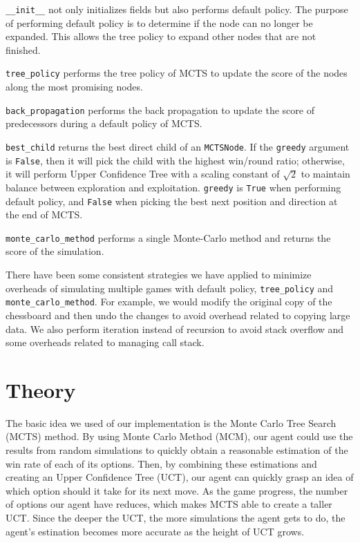 \documentclass[twoside,11pt]{article}
\begin{document}
\texttt{\_\_init\_\_} not only initializes fields but also performs default policy.
The purpose of performing default policy is to determine if the node can no longer be expanded.
This allows the tree policy to expand other nodes that are not finished.

\texttt{tree\_policy} performs the tree policy of MCTS to update the score of the nodes along the most promising nodes.

\texttt{back\_propagation} performs the back propagation to update the score of predecessors during a default policy of MCTS.

\texttt{best\_child} returns the best direct child of an \texttt{MCTSNode}.
If the \texttt{greedy} argument is \texttt{False}, then it will pick the child with the highest win/round ratio;
otherwise, it will perform Upper Confidence Tree with a scaling constant of \(\sqrt{2}\) to maintain balance between exploration and exploitation.
\texttt{greedy} is \texttt{True} when performing default policy, and \texttt{False} when picking the best next position and direction at the end of MCTS.

\texttt{monte\_carlo\_method} performs a single Monte-Carlo method and returns the score of the simulation.

There have been some consistent strategies we have applied to minimize overheads of simulating multiple games with default policy, \texttt{tree\_policy} and \texttt{monte\_carlo\_method}.
For example, we would modify the original copy of the chessboard and then undo the changes to avoid overhead related to copying large data.
We also perform iteration instead of recursion to avoid stack overflow and some overheads related to managing call stack.

\section{Theory}
The basic idea we used of our implementation is the Monte Carlo Tree Search (MCTS) method.
By using Monte Carlo Method (MCM), our agent could use the results from random simulations to quickly obtain a reasonable estimation of the win rate of each of its options.
Then, by combining these estimations and creating an Upper Confidence Tree (UCT), our agent can quickly grasp an idea of which option should it take for its next move. 
As the game progress, the number of options our agent have reduces, which makes MCTS able to create a taller UCT. 
Since the deeper the UCT, the more simulations the agent gets to do, the agent's estination becomes more accurate as the height of UCT grows.
\end{document}
